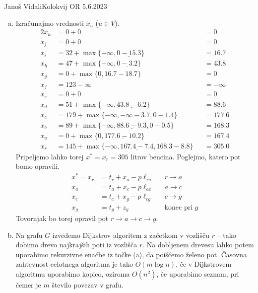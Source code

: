 \begin{naloga}{Janoš Vidali}{Kolokvij OR 5.6.2023}
\begin{odgovor}
\begin{enumerate}[(a)]
\item Izračunajmo vrednosti $x_u$ ($u \in V$).
\begin{alignat*}{2}
x_k &= 0 + 0 &&= 0 \\
x_j &= 0 + 0 &&= 0 \\
x_i &= 32 + \max\{-\infty, \underline{0 - 15.3}\} &&= 16.7 \\
x_h &= 47 + \max\{-\infty, \underline{0 - 3.2}\} &&= 43.8 \\
x_g &= 0 + \max\{\underline{0}, 16.7 - 18.7\} &&= 0 \\
x_f &= 123 - \infty &&= -\infty \\
x_e &= 0 + 0 &&= 0 \\
x_d &= 51 + \max\{-\infty, \underline{43.8 - 6.2}\} &&= 88.6 \\
x_c &= 179 + \max\{-\infty, -\infty - 3.7, \underline{0 - 1.4}\} &&= 177.6 \\
x_b &= 89 + \max\{-\infty, \underline{88.6 - 9.3}, 0 - 0.5\} &&= 168.3 \\
x_a &= 0 + \max\{0, \underline{177.6 - 10.2}\} &&= 167.4 \\
x_r &= 145 + \max\{-\infty, \underline{167.4 - 7.4}, 168.3 - 8.8\} &&= 305.0
\end{alignat*}
Pripeljemo lahko torej $x^* = x_r = 305$ litrov bencina.
Poglejmo, katero pot bomo opravili.
\begin{align*}
x^* = x_r &= t_r + x_a - p \ell_{ra} && r \to a \\
x_a &= t_a + x_c - p \ell_{ac}       && a \to c \\
x_c &= t_c + x_g - p \ell_{cg}       && c \to g \\
x_g &= t_g + z_g                     && \text{konec pri $g$}
\end{align*}
Tovornjak bo torej opravil pot $r \to a \to c \to g$.

\item Na grafu $G$ izvedemo Dijkstrov algoritem z začetkom v vozlišču $r$
-- tako dobimo drevo najkrajših poti iz vozlišča $r$.
Na dobljenem drevesu lahko potem uporabimo rekurzivne enačbe iz točke (a),
da poiščemo želeno pot.
Časovna zahtevnost celotnega algoritma je tako $O(m \log n)$,
če v Dijkstrovem algoritmu uporabimo kopico,
oziroma $O(n^2)$,
če uporabimo seznam,
pri čemer je $m$ število povezav v grafu.
\end{enumerate}
\end{odgovor}
\end{naloga}
